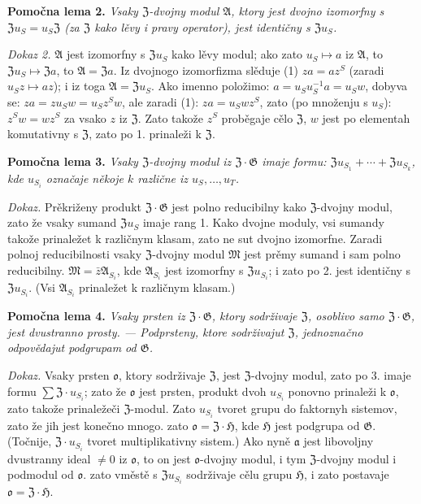 \documentclass[11pt]{article}
\begin{document}
\noindent\textbf{Pomočna lema 2.} \emph{Vsaky \(\mathfrak Z\)-dvojny modul \(\mathfrak A\), ktory jest dvojno izomorfny s \(\mathfrak Zu_S=u_S\mathfrak Z\) (za \(\mathfrak Z\) kako lěvy i pravy operator), jest identičny s \(\mathfrak Zu_S\).}

\noindent\emph{Dokaz 2.} \(\mathfrak A\) jest izomorfny s \(\mathfrak Zu_S\) kako lěvy modul; ako zato \(u_S\mapsto a\) iz \(\mathfrak A\), to \(\mathfrak Zu_S\mapsto\mathfrak Za\), to \(\mathfrak A=\mathfrak Za\). Iz dvojnogo izomorfizma slěduje (1) \(za=az^S\) (zaradi \(u_Sz\mapsto az\)); i iz toga \(\mathfrak A=\mathfrak Zu_S\). Ako imenno položimo: \(a=u_Su_S^{-1}a=u_Sw\), dobyva se: \(za=zu_Sw=u_Sz^Sw\), ale zaradi (1): \(za=u_Swz^S\), zato (po množenju s \(u_S\)): \(z^Sw=wz^S\) za vsako \(z\) iz \(\mathfrak Z\). Zato takože \(z^S\) proběgaje cělo \(\mathfrak Z\), \(w\) jest po elementah komutativny s \(\mathfrak Z\), zato po 1. prinaleži k \(\mathfrak Z\).

\noindent\textbf{Pomočna lema 3.} \emph{Vsaky \(\mathfrak Z\)-dvojny modul iz \(\mathfrak Z\cdot\mathfrak G\) imaje formu: \(\mathfrak Zu_{S_1}+\cdots+\mathfrak Zu_{S_k}\), kde \(u_{S_i}\) označaje někoje \(k\) različne iz \(u_S,\ldots,u_T\).}

\noindent\emph{Dokaz.} Prěkriženy produkt \(\mathfrak Z\cdot\mathfrak G\) jest polno reducibilny kako \(\mathfrak Z\)-dvojny modul, zato že vsaky sumand \(\mathfrak Zu_S\) imaje rang 1. Kako dvojne moduly, vsi sumandy takože prinaležet k različnym klasam, zato ne sut dvojno izomorfne. Zaradi polnoj reducibilnosti vsaky \(\mathfrak Z\)-dvojny modul \(\mathfrak M\) jest prěmy sumand i sam polno reducibilny. \(\mathfrak M=\bar z\mathfrak A_{S_i}\), kde \(\mathfrak A_{S_i}\) jest izomorfny s \(\mathfrak Zu_{S_i}\); i zato po 2. jest identičny s \(\mathfrak Zu_{S_i}\). (Vsi \(\mathfrak A_{S_i}\) prinaležet k različnym klasam.)

\noindent\textbf{Pomočna lema 4.} \emph{Vsaky prsten iz \(\mathfrak Z\cdot\mathfrak G\), ktory sodrživaje \(\mathfrak Z\), osoblivo samo \(\mathfrak Z\cdot\mathfrak G\), jest dvustranno prosty. --- Podprsteny, ktore sodrživajut \(\mathfrak Z\), jednoznačno odpovědajut podgrupam od \(\mathfrak G\).}

\noindent\emph{Dokaz.} Vsaky prsten \(\mathfrak o\), ktory sodrživaje \(\mathfrak Z\), jest \(\mathfrak Z\)-dvojny modul, zato po 3. imaje formu \(\sum\mathfrak Z\cdot u_{S_i}\); zato že \(\mathfrak o\) jest prsten, produkt dvoh \(u_{S_i}\) ponovno prinaleži k \(\mathfrak o\), zato takože prinaležeči \(\mathfrak Z\)-modul. Zato \(u_{S_i}\) tvoret grupu do faktornyh sistemov, zato že jih jest konečno mnogo. zato \(\mathfrak o=\mathfrak Z\cdot\mathfrak H\), kde \(\mathfrak H\) jest podgrupa od \(\mathfrak G\). (Točnije, \(\mathfrak Z\cdot u_{S_i}\) tvoret multiplikativny sistem.) Ako nyně \(\mathfrak a\) jest libovoljny dvustranny ideal \(\neq0\) iz \(\mathfrak o\), to on jest \(\mathfrak o\)-dvojny modul, i tym \(\mathfrak Z\)-dvojny modul i podmodul od \(\mathfrak o\). zato vměstě s \(\mathfrak Zu_{S_i}\) sodrživaje cělu grupu \(\mathfrak H\), i zato postavaje \(\mathfrak o=\mathfrak Z\cdot\mathfrak H\).
\end{document}
